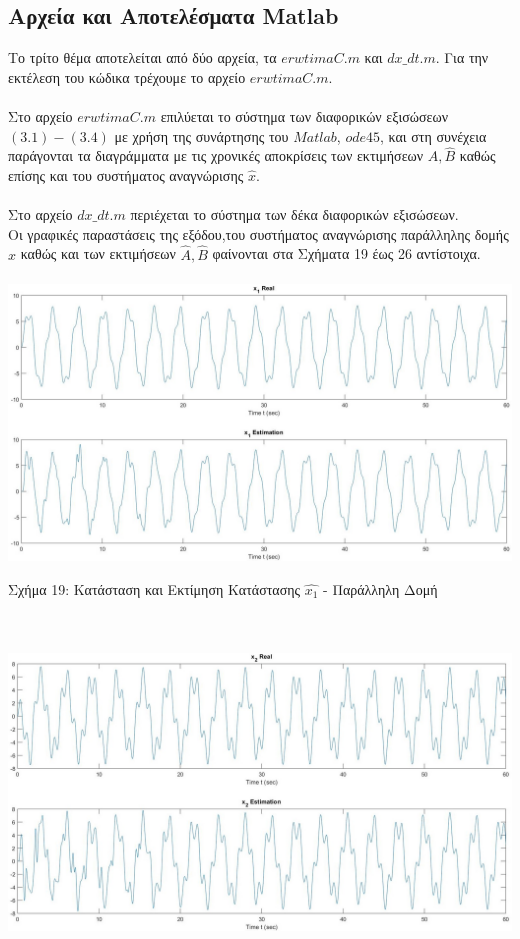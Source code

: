\documentclass[12pt]{article}
\begin{document}
\subsection{Αρχεία και Αποτελέσματα Matlab}
Το τρίτο θέμα αποτελείται από δύο αρχεία, τα $erwtimaC.m$ και $dx\_ dt.m$. Για την εκτέλεση του  κώδικα τρέχουμε το αρχείο $erwtimaC.m$.
\\ \\
Στο αρχείο $erwtimaC.m$ επιλύεται το σύστημα των διαφορικών εξισώσεων $(3.1)-(3.4)$ με χρήση της συνάρτησης του $Matlab$, $ode45$, και στη συνέχεια παράγονται τα διαγράμματα με τις χρονικές αποκρίσεις των εκτιμήσεων $\hat{A},\hat{B}$ καθώς επίσης και του συστήματος αναγνώρισης $\hat{x}$.
\\ \\
Στο αρχείο $dx\_ dt.m$ περιέχεται το σύστημα των δέκα διαφορικών εξισώσεων.
\\
Οι γραφικές παραστάσεις της εξόδου,του συστήματος αναγνώρισης παράλληλης δομής $\hat{x}$ καθώς και των εκτιμήσεων $\hat{A},\hat{B}$ φαίνονται στα Σχήματα 19 έως 26 αντίστοιχα.
\\ \\
\includegraphics[width=\linewidth]{x1_estim_3.jpg}
\centerline{Σχήμα 19: Κατάσταση και Εκτίμηση Κατάστασης $\hat{x_1}$ - Παράλληλη Δομή}
\\ \\
\includegraphics[width=\linewidth]{x2_estim_3.jpg}
\end{document}
